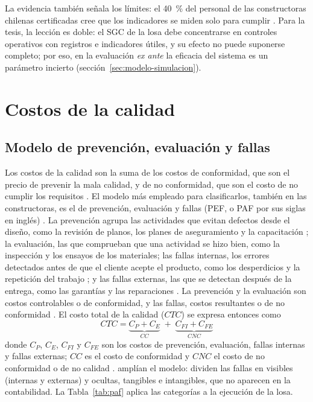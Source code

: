 La evidencia también señala los límites: el 40~\% del personal de las constructoras chilenas certificadas cree que los indicadores se miden solo para cumplir \parencite[pp.~202, 208]{romero2007}. Para la tesis, la lección es doble: el SGC de la losa debe concentrarse en controles operativos con registros e indicadores útiles, y su efecto no puede suponerse completo; por eso, en la evaluación \emph{ex ante} la eficacia del sistema es un parámetro incierto (sección~\ref{sec:modelo-simulacion}).

\section{Costos de la calidad}
\label{sec:costos-calidad}

\subsection{Modelo de prevención, evaluación y fallas}

Los costos de la calidad son la suma de los costos de conformidad, que son el precio de prevenir la mala calidad, y de no conformidad, que son el costo de no cumplir los requisitos \parencite[p.~44]{graciavillar2007}. El modelo más empleado para clasificarlos, también en las constructoras, es el de prevención, evaluación y fallas (PEF, o PAF por sus siglas en inglés) \parencite[p.~43]{graciavillar2007} \parencite[p.~42]{dzul2009}. La prevención agrupa las actividades que evitan defectos desde el diseño, como la revisión de planos, los planes de aseguramiento y la capacitación \parencite[p.~12]{alfaro2011}; la evaluación, las que comprueban que una actividad se hizo bien, como la inspección y los ensayos de los materiales; las fallas internas, los errores detectados antes de que el cliente acepte el producto, como los desperdicios y la repetición del trabajo \parencite[p.~49]{graciavillar2007}; y las fallas externas, las que se detectan después de la entrega, como las garantías y las reparaciones \parencite[p.~13]{alfaro2011}. La prevención y la evaluación son costos controlables o de conformidad, y las fallas, costos resultantes o de no conformidad \parencite[p.~48]{graciavillar2007}. El costo total de la calidad ($CTC$) se expresa entonces como
\begin{equation}
  CTC = \underbrace{C_P + C_E}_{CC} \; + \; \underbrace{C_{FI} + C_{FE}}_{CNC}
  \label{eq:ctc}
\end{equation}
donde $C_P$, $C_E$, $C_{FI}$ y $C_{FE}$ son los costos de prevención, evaluación, fallas internas y fallas externas; $CC$ es el costo de conformidad y $CNC$ el costo de no conformidad o de no calidad \parencite[p.~150]{zurita2024}. \textcite[p.~5416]{khadim2023} amplían el modelo: dividen las fallas en visibles (internas y externas) y ocultas, tangibles e intangibles, que no aparecen en la contabilidad. La Tabla~\ref{tab:paf} aplica las categorías a la ejecución de la losa.

